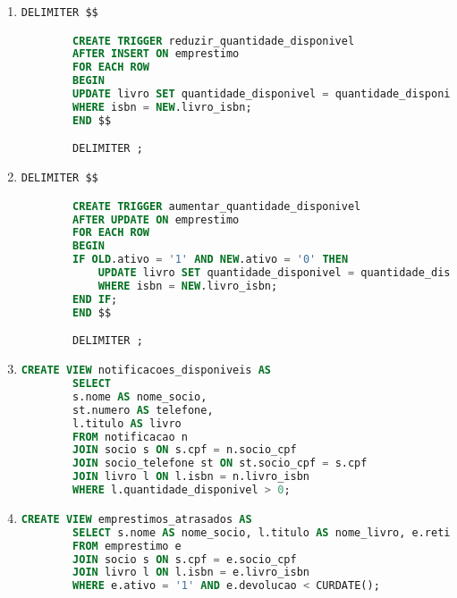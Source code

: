 \documentclass{article}
\begin{document}
\begin{enumerate}[label=\alph*)]
    
    \item  
    \begin{lstlisting}[language=SQL]
        DELIMITER $$

        CREATE TRIGGER reduzir_quantidade_disponivel
        AFTER INSERT ON emprestimo
        FOR EACH ROW
        BEGIN
        UPDATE livro SET quantidade_disponivel = quantidade_disponivel - 1 
        WHERE isbn = NEW.livro_isbn;
        END $$

        DELIMITER ;
    \end{lstlisting}

    \item 
    \begin{lstlisting}[language=SQL]
        DELIMITER $$

        CREATE TRIGGER aumentar_quantidade_disponivel
        AFTER UPDATE ON emprestimo
        FOR EACH ROW
        BEGIN
        IF OLD.ativo = '1' AND NEW.ativo = '0' THEN
            UPDATE livro SET quantidade_disponivel = quantidade_disponivel + 1 
            WHERE isbn = NEW.livro_isbn;
        END IF;
        END $$

        DELIMITER ;
    \end{lstlisting}

    \item 
    \begin{lstlisting}[language=SQL]
        CREATE VIEW notificacoes_disponiveis AS
        SELECT 
        s.nome AS nome_socio,
        st.numero AS telefone,
        l.titulo AS livro
        FROM notificacao n
        JOIN socio s ON s.cpf = n.socio_cpf
        JOIN socio_telefone st ON st.socio_cpf = s.cpf
        JOIN livro l ON l.isbn = n.livro_isbn
        WHERE l.quantidade_disponivel > 0;
    \end{lstlisting}

    \item 
    \begin{lstlisting}[language=SQL]
        CREATE VIEW emprestimos_atrasados AS
        SELECT s.nome AS nome_socio, l.titulo AS nome_livro, e.retirada, e.devolucao
        FROM emprestimo e
        JOIN socio s ON s.cpf = e.socio_cpf
        JOIN livro l ON l.isbn = e.livro_isbn
        WHERE e.ativo = '1' AND e.devolucao < CURDATE();
    \end{lstlisting}

\end{enumerate}
\end{document}

